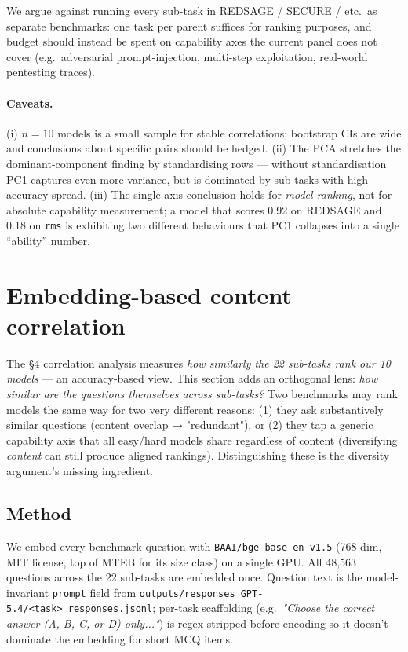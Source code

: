 \documentclass[10pt,a4paper]{article}
\begin{document}
We argue against running every sub-task in REDSAGE / SECURE / etc.\ as separate benchmarks: one task per parent suffices for ranking purposes, and budget should instead be spent on capability axes the current panel does not cover (e.g.\ adversarial prompt-injection, multi-step exploitation, real-world pentesting traces).

\paragraph{Caveats.} (i) $n=10$ models is a small sample for stable correlations; bootstrap CIs are wide and conclusions about specific pairs should be hedged. (ii) The PCA stretches the dominant-component finding by standardising rows --- without standardisation PC1 captures even more variance, but is dominated by sub-tasks with high accuracy spread. (iii) The single-axis conclusion holds for \emph{model ranking}, not for absolute capability measurement; a model that scores 0.92 on REDSAGE and 0.18 on \texttt{rms} is exhibiting two different behaviours that PC1 collapses into a single ``ability'' number.

\section{Embedding-based content correlation}\label{sec:embed}

The §4 correlation analysis measures \emph{how similarly the 22 sub-tasks rank our 10 models} — an accuracy-based view. This section adds an orthogonal lens: \emph{how similar are the questions themselves across sub-tasks?} Two benchmarks may rank models the same way for two very different reasons: (1) they ask substantively similar questions (content overlap → "redundant"), or (2) they tap a generic capability axis that all easy/hard models share regardless of content (diversifying \emph{content} can still produce aligned rankings). Distinguishing these is the diversity argument's missing ingredient.

\subsection{Method}

We embed every benchmark question with \texttt{BAAI/bge-base-en-v1.5} (768-dim, MIT license, top of MTEB for its size class) on a single GPU. All 48{,}563 questions across the 22 sub-tasks are embedded once. Question text is the model-invariant \texttt{prompt} field from \texttt{outputs/responses\_GPT-5.4/<task>\_responses.jsonl}; per-task scaffolding (e.g.\ \emph{"Choose the correct answer (A, B, C, or D) only..."}) is regex-stripped before encoding so it doesn't dominate the embedding for short MCQ items.
\end{document}
